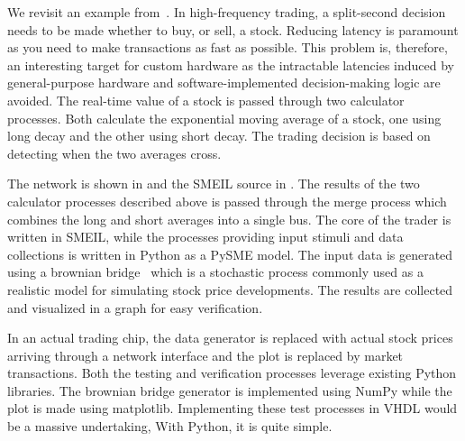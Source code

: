 We revisit an example from~\cite{asheim2016vhdl}. In high-frequency trading, a
split-second decision needs to be made whether to buy, or sell, a
stock. Reducing latency is paramount as you need to make transactions as fast as
possible. This problem is, therefore, an interesting target for custom hardware
as the intractable latencies induced by general-purpose hardware and
software-implemented decision-making logic are avoided. The real-time value of a
stock is passed through two calculator processes. Both calculate the exponential
moving average of a stock, one using long decay and the other using short
decay. The trading decision is based on detecting when the two averages
cross.~\cite{kablan2012use}

The network is shown in  and the SMEIL source in
. The results of the two calculator processes described above
is passed through the merge process which combines the long and short averages
into a single bus. The core of the trader is written in SMEIL, while the
processes providing input stimuli and data collections is written in Python as a
PySME model. The input data is generated using a brownian
bridge~\cite{glasserman2003monte} which is a stochastic process commonly used as
a realistic model for simulating stock price developments. The results are
collected and visualized in a graph for easy verification.

In an actual trading chip, the data generator is replaced with actual stock
prices arriving through a network interface and the plot is replaced by market
transactions. Both the testing and verification processes leverage existing
Python libraries. The brownian bridge generator is implemented using NumPy while
the plot is made using matplotlib. Implementing these test processes in VHDL
would be a massive undertaking, With Python, it is quite simple.

